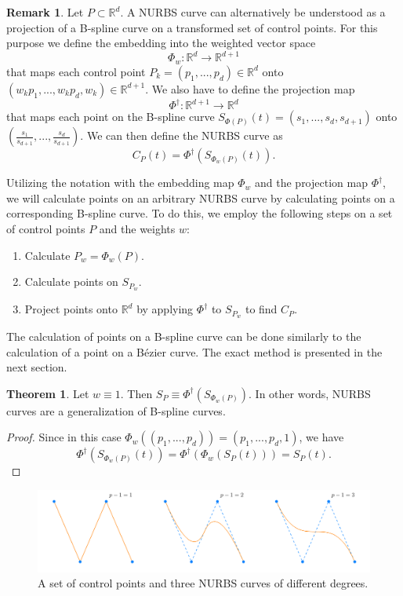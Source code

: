 \documentclass[a4paper, 11pt]{report}
\theoremstyle{definition}
\newtheorem{theorem}[definition]{Theorem}
\newtheorem*{remark}{Remark}
\begin{document}
	\begin{remark}
		Let $P \subset \mathbb{R}^d$. A NURBS curve can alternatively be understood as a projection of a B-spline curve on a transformed set of control points. For this purpose we define the embedding into the weighted vector space
			$$\Phi_w: \mathbb{R}^d \rightarrow \mathbb{R}^{d+1}$$
		that maps each control point $P_k = (p_1, ..., p_d) \in \mathbb{R}^d$ onto $(w_k p_1, ..., w_k p_d, w_k) \in \mathbb{R}^{d+1}$.
		We also have to define the projection map
			$$\Phi^\dagger: \mathbb{R}^{d+1} \rightarrow \mathbb{R}^d$$ 
		that maps each point on the B-spline curve $S_{\Phi(P)}(t) = (s_1, ..., s_d, s_{d+1})$ onto $(\frac{s_1}{s_{d+1}}, ..., \frac{s_d}{s_{d+1}})$.
		We can then define the NURBS curve as
				$$ C_P(t) = \Phi^\dagger(S_{\Phi_w(P)}(t)).$$ 
	\end{remark}

	Utilizing the notation with the embedding map $\Phi_w$ and the projection map $\Phi^\dagger$, we will calculate points on an arbitrary NURBS curve by calculating points on a corresponding B-spline curve. To do this, we employ the following steps on a set of control points $P$ and the weights $w$:
	\begin{enumerate}
		\item Calculate $P_w = \Phi_w(P)$.
		\item Calculate points on $S_{P_w}$.
		\item Project points onto $\mathbb{R}^d$ by applying $\Phi^\dagger$ to $S_{P_w}$ to find $C_P$.
	\end{enumerate}
	The calculation of points on a B-spline curve can be done similarly to the calculation of a point on a Bézier curve. The exact method is presented in the next section.

	\begin{theorem}
		Let $w \equiv 1$. Then $S_P \equiv \Phi^\dagger(S_{\Phi_w(P)})$. In other words, NURBS curves are a generalization of B-spline curves.
	\end{theorem}
	\begin{proof}
		Since in this case $\Phi_w((p_1, ..., p_d)) = (p_1, ..., p_d, 1)$, we have
			$$\Phi^\dagger(S_{\Phi_w(P)}(t)) = \Phi^\dagger(\Phi_w(S_P(t))) = S_P(t).$$
	\end{proof}

	\begin{figure}[H]
		\centering
		\includegraphics[width=\textwidth]{../tec/nurbsCurve/nurbsCurve.png}
		\caption{A set of control points and three NURBS curves of different degrees.}
	\end{figure}
\end{document}
